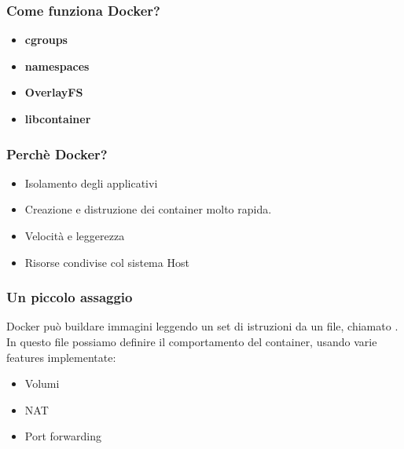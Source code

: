 \documentclass{beamer}
\begin{document}

\begin{frame}
    \frametitle{Come funziona Docker?} 
    \begin{itemize}
        \item<1-> \textbf{cgroups}
        \item<2-> \textbf{namespaces}
        \item<3-> \textbf{OverlayFS}
        \item<4-> \textbf{libcontainer}
    \end{itemize}
\end{frame}


\begin{frame}
    \frametitle{Perch\`e Docker?}
    \begin{itemize}
        \item<1-> Isolamento degli applicativi
        \item<2-> Creazione e distruzione dei container molto rapida. 
        \item<3-> Velocit\`a e leggerezza
        \item<4-> Risorse condivise col sistema Host
    \end{itemize}
\end{frame}


\begin{frame}
    \frametitle{Un piccolo assaggio}
    Docker pu\`o buildare immagini leggendo un set di istruzioni da un file, chiamato .
    In questo file possiamo definire il comportamento del container, usando varie features implementate:
    \begin{itemize}
        \item<1-> Volumi
        \item<2-> NAT 
        \item<3-> Port forwarding
    \end{itemize}
\end{frame}

\end{document}
